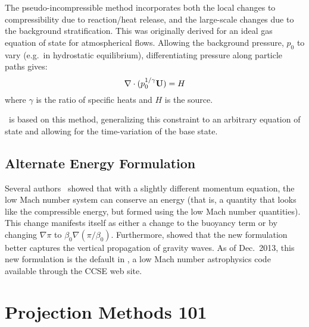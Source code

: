 The pseudo-incompressible method incorporates both the local changes
to compressibility due to reaction/heat release, and the large-scale
changes due to the background stratification.  This was originally
derived for an ideal gas equation of state for atmospherical flows.
Allowing the background pressure, $p_0$ to vary (e.g.\ in hydrostatic
equilibrium), differentiating pressure along particle paths gives:
\begin{equation}
\nabla \cdot (p_0^{1/\gamma} {\bf U}) = H
\end{equation}
where $\gamma$ is the ratio of specific heats and $H$ is the source.

\maestro\ is based on this method, generalizing this constraint to an
arbitrary equation of state and allowing for the time-variation of the
base state.

\subsection{Alternate Energy Formulation}

Several authors~\cite{KP:2012,VLBWZ:2013} showed that with a slightly
different momentum equation, the low Mach number system can conserve
an energy (that is, a quantity that looks like the compressible
energy, but formed using the low Mach number quantities).  This change
manifests itself as either a change to the buoyancy term or by
changing $\nabla \pi$ to $\beta_0 \nabla (\pi/\beta_0)$.  Furthermore,
\cite{VLBWZ:2013} showed that the new formulation better captures the
vertical propagation of gravity waves.  As of
Dec.\ 2013, this new formulation is the default in \maestro, a low
Mach number astrophysics code available through the CCSE web site.

\section{Projection Methods 101}

